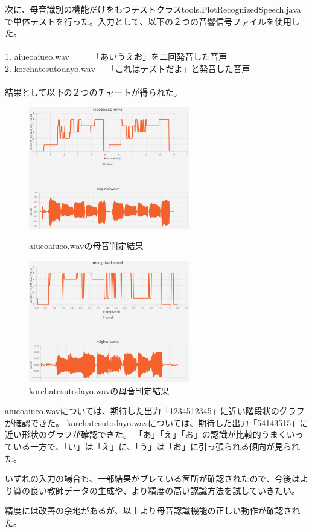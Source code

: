 \documentclass[a4j]{jarticle}
\begin{document}
次に、母音識別の機能だけをもつテストクラスtools.PlotRecognizedSpeech.javaで単体テストを行った。入力として、以下の２つの音響信号ファイルを使用した。\\
　\\
1. aiueoaiueo.wav　     　 「あいうえお」を二回発音した音声\\
2. korehatesutodayo.wav　  「これはテストだよ」と発音した音声\\
　\\
結果として以下の２つのチャートが得られた。

\begin{figure}[htbp]
 \begin{minipage}{0.5\hsize}
  \begin{center}
   \includegraphics[width=70mm]{aiueoaiueo.eps}
  \end{center}
  \caption{aiueoaiueo.wavの母音判定結果}
  \label{fig:one}
 \end{minipage}
 \begin{minipage}{0.5\hsize}
  \begin{center}
   \includegraphics[width=70mm]{korehatesutodayo.eps}
  \end{center}
  \caption{korehatesutodayo.wavの母音判定結果}
  \label{fig:two}
 \end{minipage}
\end{figure}


aiueoaiueo.wavについては、期待した出力「1234512345」に近い階段状のグラフが確認できた。
korehatesutodayo.wavについては、期待した出力「54143515」に近い形状のグラフが確認できた。
「あ」「え」「お」の認識が比較的うまくいっている一方で、「い」は「え」に、「う」は「お」に引っ張られる傾向が見られた。

いずれの入力の場合も、一部結果がブレている箇所が確認されたので、今後はより質の良い教師データの生成や、より精度の高い認識方法を試していきたい。

精度には改善の余地があるが、以上より母音認識機能の正しい動作が確認された。
\end{document}
